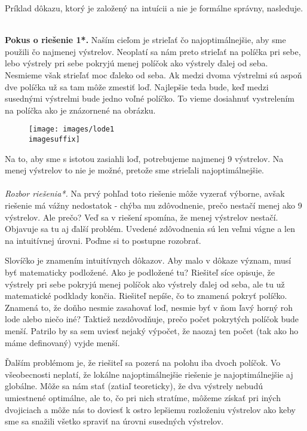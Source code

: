 {Príklad dôkazu, ktorý je založený na intuícii a nie je formálne správny, nasleduje.\\
\\
{\textbf{Pokus o riešenie 1*.}
Naším cieľom je strieľať čo najoptimálnejšie, aby sme použili čo najmenej výstrelov. Neoplatí sa nám preto strieľať na políčka pri sebe, lebo výstrely pri sebe pokryjú menej políčok ako výstrely ďalej od seba. Nesmieme však strieľať moc ďaleko od seba. Ak medzi dvoma výstrelmi sú aspoň dve políčka už sa tam môže zmestiť loď. Najlepšie teda bude, keď medzi susednými výstrelmi bude jedno voľné políčko. To vieme dosiahnuť vystrelením na políčka ako je znázornené na obrázku.
\begin{figure}[h]
    \centering
    \texttt{[image: images/lode1\\imagesuffix]}
    \caption{}
    \label{fig:lode1}
\end{figure}
Na to, aby sme s istotou zasiahli loď, potrebujeme najmenej 9 výstrelov. Na menej výstrelov to nie je možné, pretože sme strieľali najoptimálnejšie.\\
\\
\textit{Rozbor riešenia*.} Na prvý pohľad toto riešenie môže vyzerať výborne, avšak riešenie má vážny nedostatok - chýba mu zdôvodnenie, prečo nestačí menej ako 9 výstrelov. Ale prečo? Veď sa v riešení spomína, že menej výstrelov nestačí. Objavuje sa tu aj ďalší problém. Uvedené zdôvodnenia sú len veľmi vágne a len na intuitívnej úrovni. Poďme si to postupne rozobrať. 

 Slovíčko  je znamením intuitívnych dôkazov. Aby malo v dôkaze význam, musí byť matematicky podložené. Ako je podložené tu? Riešiteľ síce opisuje, že výstrely pri sebe pokryjú menej políčok ako výstrely ďalej od seba, ale tu už matematické podklady končia. Riešiteľ nepíše, čo to znamená pokryť políčko. Znamená to, že doňho nesmie zasahovať loď, nesmie byť v ňom ľavý horný roh lode alebo niečo iné? Taktiež nezdôvodňuje, prečo počet pokrytých políčok bude menší. Patrilo by sa sem uviesť nejaký výpočet, že naozaj ten počet (tak ako ho máme definovaný) vyjde menší.

Ďalším problémom je, že riešiteľ sa pozerá na polohu iba dvoch políčok. Vo všeobecnosti neplatí, že lokálne najoptimálnejšie riešenie je najoptimálnejšie aj globálne. Môže sa nám stať (zatiaľ teoreticky), že dva výstrely nebudú umiestnené optimálne, ale to, čo pri nich stratíme, môžeme získať pri iných dvojiciach a môže nás to doviesť k ostro lepšiemu rozloženiu výstrelov ako keby sme sa snažili všetko spraviť  na úrovni susedných výstrelov.

}}

